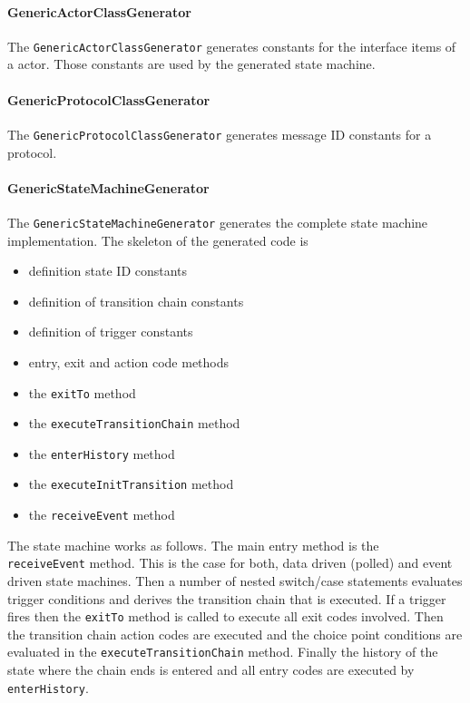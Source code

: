 \paragraph{GenericActorClassGenerator}

The \texttt{GenericActorClassGenerator} generates constants for the interface items of a actor. Those constants are used by the generated state machine.

\paragraph{GenericProtocolClassGenerator}

The \texttt{GenericProtocolClassGenerator} generates message ID constants for a protocol.

\paragraph{GenericStateMachineGenerator}

\begin{flushleft}The \texttt{GenericStateMachineGenerator} generates the complete state machine implementation. The skeleton of the generated code is\end{flushleft}

\begin{itemize}
\item definition state ID constants
\item definition of transition chain constants
\item definition of trigger constants
\item entry, exit and action code methods
\item the \texttt{exitTo} method 
\item the \texttt{executeTransitionChain} method
\item the \texttt{enterHistory} method
\item the \texttt{executeInitTransition} method
\item the \texttt{receiveEvent} method
\end{itemize}

The state machine works as follows. The main entry method is the \\ \texttt{receiveEvent} method. This is the case for both, data driven (polled) and event driven state machines. Then a number of nested switch/case statements evaluates trigger conditions and derives the transition chain that is executed. If a trigger fires then the \texttt{exitTo} method is called to execute all exit codes involved. Then the transition chain action codes are executed and the choice point conditions are evaluated in the \texttt{executeTransitionChain} method. Finally the history of the state where the chain ends is entered and all entry codes are executed by \texttt{enterHistory}.

